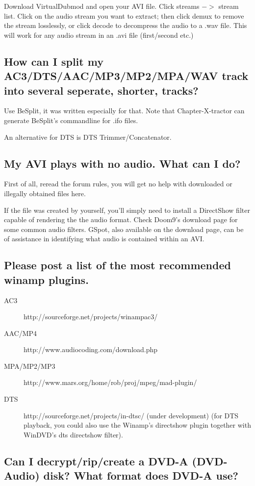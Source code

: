 ﻿\documentclass[12pt]{article}
\begin{document}
Download VirtualDubmod and open your AVI file. Click streams $->$ stream list. Click on the audio
stream you want to extract; then click demux to remove the stream losslessly, or click decode to
decompress the audio to a .wav file. This will work for any audio stream in an .avi file
(first/second etc.)

\subsection{How can I split my AC3/DTS/AAC/MP3/MP2/MPA/WAV track into several seperate, shorter,
tracks?}

Use BeSplit, it was written especially for that. Note that Chapter-X-tractor can generate BeSplit's
commandline for .ifo files.

An alternative for DTS is DTS Trimmer/Concatenator.

\subsection{My AVI plays with no audio. What can I do?}

First of all, reread the forum rules, you will get no help with downloaded or illegally obtained
files here.

If the file was created by yourself, you'll simply need to install a DirectShow filter capable of
rendering the the audio format. Check Doom9's download page for some common audio filters. GSpot,
also available on the download page, can be of assistance in identifying what audio is contained
within an AVI.

\subsection{Please post a list of the most recommended winamp plugins.}
\begin{description}
  \item[AC3] http://sourceforge.net/projects/winampac3/
  \item[AAC/MP4] http://www.audiocoding.com/download.php
  \item[MPA/MP2/MP3] http://www.mars.org/home/rob/proj/mpeg/mad-plugin/
  \item[DTS] http://sourceforge.net/projects/in-dtsc/ (under development) (for DTS playback, you
could also use the Winamp's directshow plugin together with WinDVD's dts directshow filter).
\end{description}

\subsection{Can I decrypt/rip/create a DVD-A (DVD-Audio) disk? What format does DVD-A use?}
\end{document}
